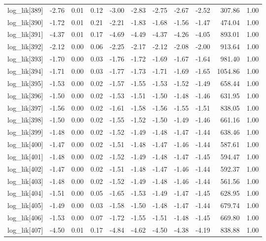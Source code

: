 \begin{table}[ht]
\begin{tabular}{rrrrrrrrrrr}
  log\_lik[389] & -2.76 & 0.01 & 0.12 & -3.00 & -2.83 & -2.75 & -2.67 & -2.52 & 307.86 & 1.00 \\ 
  log\_lik[390] & -1.72 & 0.01 & 0.21 & -2.21 & -1.83 & -1.68 & -1.56 & -1.47 & 474.04 & 1.00 \\ 
  log\_lik[391] & -4.37 & 0.01 & 0.17 & -4.69 & -4.49 & -4.37 & -4.26 & -4.05 & 893.01 & 1.00 \\ 
  log\_lik[392] & -2.12 & 0.00 & 0.06 & -2.25 & -2.17 & -2.12 & -2.08 & -2.00 & 913.64 & 1.00 \\ 
  log\_lik[393] & -1.70 & 0.00 & 0.03 & -1.76 & -1.72 & -1.69 & -1.67 & -1.64 & 981.40 & 1.00 \\ 
  log\_lik[394] & -1.71 & 0.00 & 0.03 & -1.77 & -1.73 & -1.71 & -1.69 & -1.65 & 1054.86 & 1.00 \\ 
  log\_lik[395] & -1.53 & 0.00 & 0.02 & -1.57 & -1.55 & -1.53 & -1.52 & -1.49 & 658.44 & 1.00 \\ 
  log\_lik[396] & -1.50 & 0.00 & 0.02 & -1.53 & -1.51 & -1.50 & -1.48 & -1.46 & 631.95 & 1.00 \\ 
  log\_lik[397] & -1.56 & 0.00 & 0.02 & -1.61 & -1.58 & -1.56 & -1.55 & -1.51 & 838.05 & 1.00 \\ 
  log\_lik[398] & -1.50 & 0.00 & 0.02 & -1.55 & -1.52 & -1.50 & -1.49 & -1.46 & 661.16 & 1.00 \\ 
  log\_lik[399] & -1.48 & 0.00 & 0.02 & -1.52 & -1.49 & -1.48 & -1.47 & -1.44 & 638.46 & 1.00 \\ 
  log\_lik[400] & -1.47 & 0.00 & 0.02 & -1.51 & -1.48 & -1.47 & -1.46 & -1.44 & 587.61 & 1.00 \\ 
  log\_lik[401] & -1.48 & 0.00 & 0.02 & -1.52 & -1.49 & -1.48 & -1.47 & -1.45 & 594.47 & 1.00 \\ 
  log\_lik[402] & -1.47 & 0.00 & 0.02 & -1.51 & -1.48 & -1.47 & -1.46 & -1.44 & 592.37 & 1.00 \\ 
  log\_lik[403] & -1.48 & 0.00 & 0.02 & -1.52 & -1.49 & -1.48 & -1.46 & -1.44 & 561.56 & 1.00 \\ 
  log\_lik[404] & -1.51 & 0.00 & 0.05 & -1.65 & -1.53 & -1.49 & -1.47 & -1.45 & 628.95 & 1.00 \\ 
  log\_lik[405] & -1.49 & 0.00 & 0.03 & -1.58 & -1.50 & -1.48 & -1.47 & -1.44 & 679.74 & 1.00 \\ 
  log\_lik[406] & -1.53 & 0.00 & 0.07 & -1.72 & -1.55 & -1.51 & -1.48 & -1.45 & 669.80 & 1.00 \\ 
  log\_lik[407] & -4.50 & 0.01 & 0.17 & -4.84 & -4.62 & -4.50 & -4.38 & -4.19 & 838.88 & 1.00 \\ 

\end{tabular}
\end{table}
